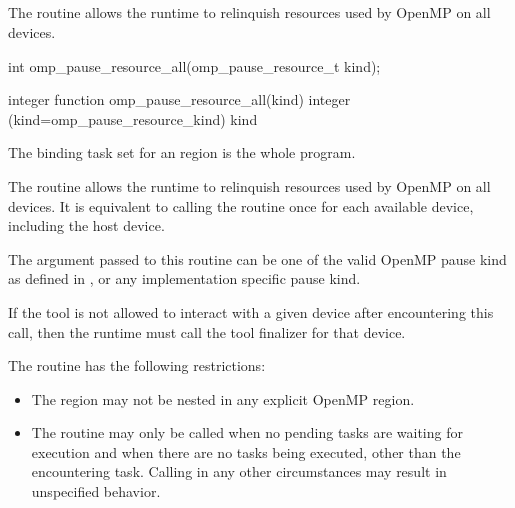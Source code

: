 \subsection{}
\label{subsec:omp_pause_resource_all}
\summary

The  routine allows the runtime to 
relinquish resources used by OpenMP on all devices.

\begin{samepage}
\format
\begin{ccppspecific}
\begin{ompcFunction}
int omp_pause_resource_all(omp_pause_resource_t kind);
\end{ompcFunction}
\end{ccppspecific}
\end{samepage}

\begin{fortranspecific}
\begin{ompfFunction}
integer function omp_pause_resource_all(kind)
integer (kind=omp_pause_resource_kind) kind
\end{ompfFunction}
\end{fortranspecific}

\binding
The binding task set for an  region is the whole program.

\effect
The  routine allows the runtime to 
relinquish resources used by OpenMP on all devices. It is equivalent 
to calling the  routine once for each 
available device, including the host device.

The argument  passed to this routine can be one of the 
valid OpenMP pause kind as defined in , 
or any implementation specific pause kind. 

\tools
If the tool is not allowed to interact with a given device after encountering 
this call, then the runtime must call the tool finalizer for that device.

\restrictions
The  routine has the following restrictions:

\begin{itemize}
\item The  region may not be nested in any explicit
      OpenMP region.
\item The routine may only be called when no pending tasks are waiting
      for execution and when there are no tasks being executed, other than
      the encountering task.  Calling in any other circumstances may result
      in unspecified behavior.
\end{itemize}

